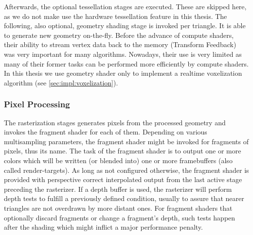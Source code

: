 \documentclass[thesis.tex]{subfiles}
\begin{document}
Afterwards, the optional tessellation stages are executed.
These are skipped here, as we do not make use the hardware tessellation feature in this thesis.
The following, also optional, geometry shading stage is invoked per triangle.
It is able to generate new geometry on-the-fly.
Before the advance of compute shaders, their ability to stream vertex data back to the memory (Transform Feedback) was very important for many algorithms.
Nowadays, their use is very limited as many of their former tasks can be performed more efficiently by compute shaders.
In this thesis we use geometry shader only to implement a realtime voxelization algorithm (see \autoref{sec:impl:voxelization}).


\subsubsection{Pixel Processing}
The rasterization stages generates pixels from the processed geometry and invokes the fragment shader for each of them.
Depending on various multisampling parameters, the fragment shader might be invoked for fragments of pixels, thus its name.
The task of the fragment shader is to output one or more colors which will be written (or blended into) one or more framebuffers (also called render-targets).
As long as not configured otherwise, the fragment shader is provided with perspective correct interpolated output from the last active stage preceding the rasterizer.
If a depth buffer is used, the rasterizer will perform depth tests to fulfill a previously defined condition, usually to assure that nearer triangles are not overdrawn by more distant ones.
For fragment shaders that optionally discard fragments or change a fragment's depth, such tests happen after the shading which might inflict a major performance penalty.
\end{document}
